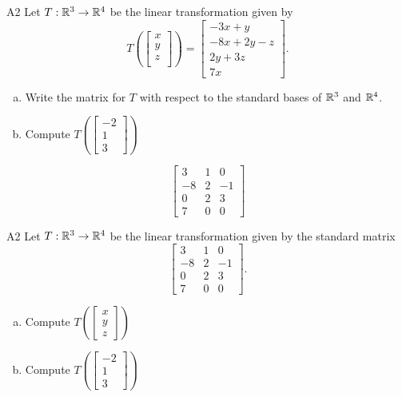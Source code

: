 \begin{problem}{A2}
Let $T: \mathbb{R}^3\rightarrow \mathbb{R}^4$ be the linear transformation given by $$T\left(\begin{bmatrix} x \\ y \\ z \\  \end{bmatrix} \right) = \begin{bmatrix} -3x+y \\ -8x+2y-z \\ 2y+3z \\ 7x \end{bmatrix}.$$  
\begin{enumerate}[(a)]
\item Write the matrix for $T$ with respect to the standard bases of $\mathbb{R}^3$ and $\mathbb{R}^4$.
\item Compute \( T\left( \begin{bmatrix}-2 \\ 1 \\ 3 \end{bmatrix} \right) \)
\end{enumerate}
\end{problem}
\begin{solution}
$$\begin{bmatrix} 3 & 1 & 0 \\ -8 & 2 & -1 \\ 0 & 2 & 3 \\ 7 & 0 & 0 \end{bmatrix}$$
\end{solution}

\begin{problem}{A2}
Let $T: \mathbb{R}^3\rightarrow \mathbb{R}^4$ be the linear transformation given by the standard matrix
$$\begin{bmatrix} 3 & 1 & 0 \\ -8 & 2 & -1 \\ 0 & 2 & 3 \\ 7 & 0 & 0 \end{bmatrix}.$$
\begin{enumerate}[(a)]
\item Compute \( T\left( \begin{bmatrix}x\\ y \\ z \end{bmatrix} \right) \)
\item Compute \( T\left( \begin{bmatrix}-2 \\ 1 \\ 3 \end{bmatrix} \right) \)
\end{enumerate}
\end{problem}

